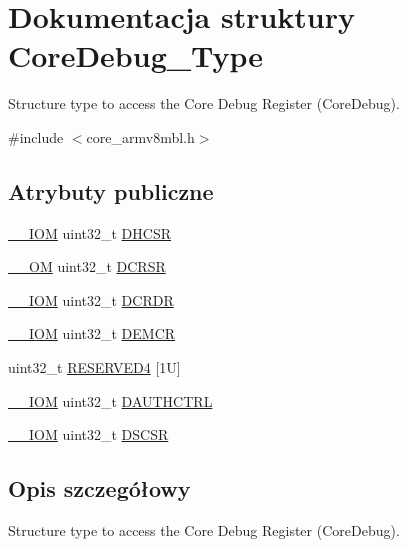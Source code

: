 \hypertarget{struct_core_debug___type}{}\section{Dokumentacja struktury Core\+Debug\+\_\+\+Type}
\label{struct_core_debug___type}


Structure type to access the Core Debug Register (Core\+Debug).  




{\ttfamily \#include $<$core\+\_\+armv8mbl.\+h$>$}

\subsection*{Atrybuty publiczne}
\begin{DoxyCompactItemize}
\item 
\hyperlink{core__sc300_8h_ab6caba5853a60a17e8e04499b52bf691}{\+\_\+\+\_\+\+I\+OM} uint32\+\_\+t \hyperlink{struct_core_debug___type_ad63554e4650da91a8e79929cbb63db66}{D\+H\+C\+SR}
\item 
\hyperlink{core__sc300_8h_a0ea2009ed8fd9ef35b48708280fdb758}{\+\_\+\+\_\+\+OM} uint32\+\_\+t \hyperlink{struct_core_debug___type_af907cf64577eaf927dac6787df6dd98b}{D\+C\+R\+SR}
\item 
\hyperlink{core__sc300_8h_ab6caba5853a60a17e8e04499b52bf691}{\+\_\+\+\_\+\+I\+OM} uint32\+\_\+t \hyperlink{struct_core_debug___type_aab3cc92ef07bc1f04b3a3aa6db2c2d55}{D\+C\+R\+DR}
\item 
\hyperlink{core__sc300_8h_ab6caba5853a60a17e8e04499b52bf691}{\+\_\+\+\_\+\+I\+OM} uint32\+\_\+t \hyperlink{struct_core_debug___type_aeb3126abc4c258a858f21f356c0df6ee}{D\+E\+M\+CR}
\item 
uint32\+\_\+t \hyperlink{struct_core_debug___type_ac965e9b3abb1519676f2a6a959eaedb2}{R\+E\+S\+E\+R\+V\+E\+D4} \mbox{[}1\+U\mbox{]}
\item 
\hyperlink{core__sc300_8h_ab6caba5853a60a17e8e04499b52bf691}{\+\_\+\+\_\+\+I\+OM} uint32\+\_\+t \hyperlink{struct_core_debug___type_a1b319a8279b9ff2572ab5391dba5bb88}{D\+A\+U\+T\+H\+C\+T\+RL}
\item 
\hyperlink{core__sc300_8h_ab6caba5853a60a17e8e04499b52bf691}{\+\_\+\+\_\+\+I\+OM} uint32\+\_\+t \hyperlink{struct_core_debug___type_ad9fa5e915e038e20b9be88d54d432fb8}{D\+S\+C\+SR}
\end{DoxyCompactItemize}


\subsection{Opis szczegółowy}
Structure type to access the Core Debug Register (Core\+Debug). 

